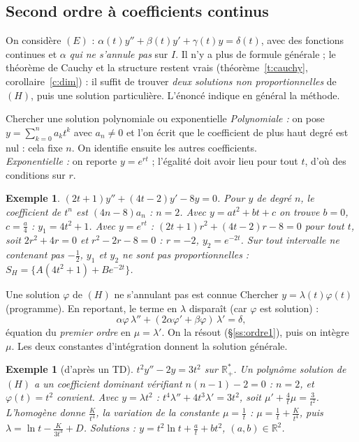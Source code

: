 \documentclass[a4paper,11pt]{article}
\numberwithin{equation}{section}
\numberwithin{figure}{section}
\numberwithin{table}{section}
\theoremstyle{enonce}
\theoremstyle{exemple}
\newtheorem{exemple}[definition]{Exemple}
\theoremstyle{remarque}
\newcommand{\R}{\mathbb{R}}
\newif\ifPT \ifdefined\VERSIONPT \PTtrue \else \PTfalse \fi
\begin{document}
\ifPT
\subsection{Second ordre à coefficients continus}\label{ss:continus}

On considère $(E)$ : $\alpha(t)y''+\beta(t)y'+\gamma(t)y=\delta(t)$, avec des fonctions continues et $\alpha$ \emph{qui ne
s'annule pas} sur $I$. Il n'y a plus de formule générale ; le théorème de Cauchy et la structure restent vrais
(théorème~\ref{t:cauchy}, corollaire~\ref{c:dim}) : il suffit de trouver \emph{deux solutions non proportionnelles} de $(H)$, puis
une solution particulière. L'énoncé indique en général la méthode.

\begin{methode}{Chercher une solution polynomiale ou exponentielle}\label{m:poly}
\emph{Polynomiale :} on pose $y=\sum_{k=0}^na_kt^k$ avec $a_n\neq0$ et l'on écrit que le coefficient de plus haut degré est nul :
cela fixe $n$. On identifie ensuite les autres coefficients.\\
\emph{Exponentielle :} on reporte $y=e^{rt}$ ; l'égalité doit avoir lieu pour tout $t$, d'où des conditions sur $r$.
\end{methode}

\begin{exemple}
$(2t+1)y''+(4t-2)y'-8y=0$. Pour $y$ de degré $n$, le coefficient de $t^n$ est $(4n-8)a_n$ : $n=2$. Avec $y=at^2+bt+c$ on trouve
$b=0$, $c=\frac a4$ : $y_1=4t^2+1$. Avec $y=e^{rt}$ : $(2t+1)r^2+(4t-2)r-8=0$ pour tout $t$, soit $2r^2+4r=0$ et $r^2-2r-8=0$ :
$r=-2$, $y_2=e^{-2t}$. Sur tout intervalle ne contenant pas $-\frac12$, $y_1$ et $y_2$ ne sont pas proportionnelles :
$S_H=\{A(4t^2+1)+Be^{-2t}\}$.
\end{exemple}

\begin{methode}{Une solution $\varphi$ de $(H)$ ne s'annulant pas est connue}\label{m:abaisse}
Chercher $y=\lambda(t)\varphi(t)$ (programme). En reportant, le terme en $\lambda$ disparaît (car $\varphi$ est solution) :
\[\alpha\varphi\,\lambda''+(2\alpha\varphi'+\beta\varphi)\,\lambda'=\delta,\]
équation du \emph{premier ordre} en $\mu=\lambda'$. On la résout (§\ref{ss:ordre1}), puis on intègre $\mu$. Les deux constantes
d'intégration donnent la solution générale.
\end{methode}

\begin{exemple}[d'après un TD]
$t^2y''-2y=3t^2$ sur $\R_+^*$. Un polynôme solution de $(H)$ a un coefficient dominant vérifiant $n(n-1)-2=0$ : $n=2$, et
$\varphi(t)=t^2$ convient. Avec $y=\lambda t^2$ : $t^4\lambda''+4t^3\lambda'=3t^2$, soit $\mu'+\frac4t\mu=\frac3{t^2}$.
L'homogène donne $\frac K{t^4}$, la variation de la constante $\mu=\frac1t$ : $\mu=\frac1t+\frac K{t^4}$, puis
$\lambda=\ln t-\frac K{3t^3}+D$. Solutions : $y=t^2\ln t+\frac at+bt^2$, $(a,b)\in\R^2$.
\end{exemple}
\end{document}
